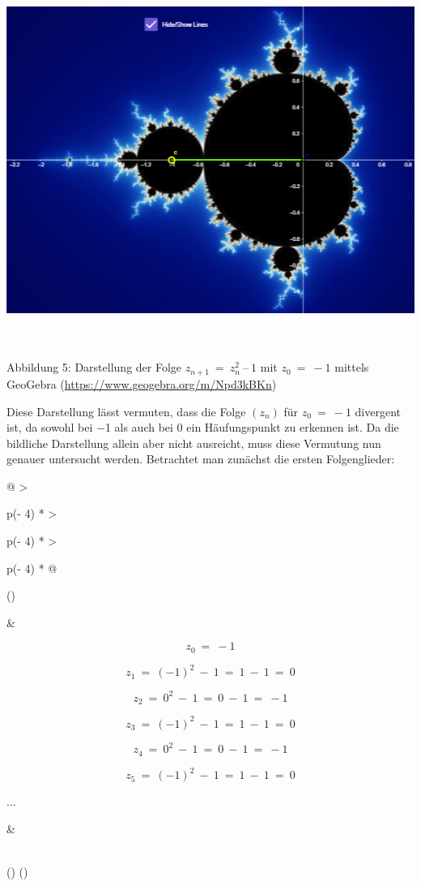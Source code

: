 \documentclass{book}
\begin{document}
\includegraphics[width=6.33858in,height=4.74871in]{image10.png}

\protect\hypertarget{_Toc167901655}{}{}Abbildung 5: Darstellung der
Folge \(z_{n + 1}\  = \ z_{n}^{2}\ –\ 1\) mit \(z_{0}\  = \  - 1\)
mittels GeoGebra (\url{https://www.geogebra.org/m/Npd3kBKn})

Diese Darstellung lässt vermuten, dass die Folge
\(\left( z_{n} \right)\) für \(z_{0}\  = \  - 1\) divergent ist, da
sowohl bei \(-\)1 als auch bei 0 ein Häufungspunkt zu erkennen ist. Da
die bildliche Darstellung allein aber nicht ausreicht, muss diese
Vermutung nun genauer untersucht werden. Betrachtet man zunächst die
ersten Folgenglieder:

\begin{longtable}[]{@{}
  >{\raggedright\arraybackslash}p{(\columnwidth - 4\tabcolsep) * }
  >{\raggedright\arraybackslash}p{(\columnwidth - 4\tabcolsep) * }
  >{\raggedright\arraybackslash}p{(\columnwidth - 4\tabcolsep) * }@{}}
\toprule()
\begin{minipage}[b]{\linewidth}\raggedright
\end{minipage} & \begin{minipage}[b]{\linewidth}\raggedright
\[z_{0}\  = \  - 1\]

\[z_{1}\  = \ ( - 1)^{2}\  - \ 1\  = \ 1\  - \ 1\  = \ 0\]

\[z_{2}\  = \ 0^{2}\  - \ 1\  = \ 0\  - \ 1\  = \  - 1\]

\[z_{3}\  = \ ( - 1)^{2}\  - \ 1\  = \ 1\  - \ 1\  = \ 0\]

\[z_{4}\  = \ 0^{2}\  - \ 1\  = \ 0\  - \ 1\  = \  - 1\]

\[z_{5}\  = \ ( - 1)^{2}\  - \ 1\  = \ 1\  - \ 1\  = \ 0\]

...
\end{minipage} & \begin{minipage}[b]{\linewidth}\raggedright
\end{minipage} \\
\midrule()
\endhead
\bottomrule()
\end{longtable}
\end{document}
